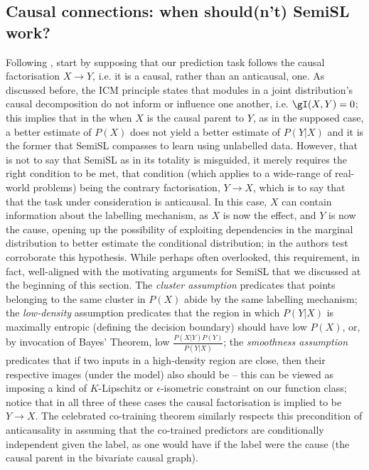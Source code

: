 \subsection{
  Causal connections: when should(n't) SemiSL work?
}\label{ssec:semisl-causality}
Following \cite{scholkopf2021toward}, start by supposing that our prediction task follows the
causal factorisation \( X \to Y\), i.e. it is a causal, rather than an anticausal, one.
%
As discussed before, the ICM principle states that modules in a joint distribution's causal
decomposition do not inform or influence one another, i.e. \(\gI(X, Y) = 0 \); this implies that in
the when \(X\) is the causal parent to \(Y\), as in the supposed case, a better estimate of
\(P(X)\) does not yield a better estimate of \(P(Y|X)\) and it is the former that SemiSL
compasses to learn using unlabelled data.
%
However, that is not to say that SemiSL as in its totality is misguided, it merely requires the
right condition to be met, that condition (which applies to a wide-range of real-world problems)
being the contrary factorisation, \(Y \to X \), which is to say that that the task under
consideration is anticausal.
%
In this case, \(X\) can contain information about the labelling mechanism, as \(X\) is now the
effect, and \(Y\) is now the cause, opening up the possibility of exploiting dependencies in the
marginal distribution to better estimate the conditional distribution; in
\cite{scholkopf2012causal} the authors test corroborate this hypothesis.
%
While perhaps often overlooked, this requirement, in fact, well-aligned with the motivating
arguments for SemiSL that we discussed at the beginning of this section.
%
The \emph{cluster assumption} predicates that points belonging to the same cluster in \(P(X)\)
abide by the same labelling mechanism; 
%
the \emph{low-density} assumption predicates that the region in which \(P(Y|X)\) is maximally
entropic (defining the decision boundary) should have low \(P(X)\), or, by invocation of Bayes'
Theorem, low \( \frac{ P(X|Y)P(Y) }{ P(Y|X) } \); 
%
the \emph{smoothness assumption} predicates that if two inputs in a high-density region are close,
then their respective images (under the model) also should be -- this can be viewed as imposing a
kind of \(K\)-Lipschitz or \(\epsilon\)-isometric constraint on our function class;
%
notice that in all three of these cases the causal factorisation is implied to be \(Y \to X \).
%
The celebrated co-training theorem \citep{blum1998combining} similarly respects this precondition
of anticausality in assuming that the co-trained predictors are conditionally independent given the
label, as one would have if the label were the cause (the causal parent in the bivariate causal graph).
%

